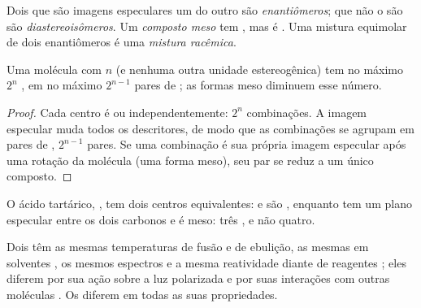 \begin{definition}\label{def:b1:stereochemistry-in-depth:enantiomers}
Dois  que são imagens especulares um do outro são
\emph{enantiômeros};  que não o são são
\emph{diastereoisômeros}. Um \emph{composto
meso} tem , mas é . Uma
mistura equimolar de dois enantiômeros é uma \emph{mistura
racêmica}.
\end{definition}

\begin{proposition}\label{prop:b1:stereochemistry-in-depth:max-stereoisomers}
Uma molécula com $n$  (e nenhuma outra unidade
estereogênica) tem no máximo $2^n$ , em no máximo
$2^{n-1}$ pares de ; as formas meso diminuem esse número.
\end{proposition}

\begin{proof}
Cada centro é  ou  independentemente: $2^n$ combinações. A
imagem especular muda todos os descritores, de modo que as combinações
se agrupam em pares de , $2^{n-1}$ pares. Se uma combinação
é sua própria imagem especular após uma rotação da molécula (uma forma
meso), seu par se reduz a um único composto.
\end{proof}

O ácido tartárico, , tem dois centros
equivalentes:  e  são , enquanto 
tem um plano especular entre os dois carbonos e é meso: três
, e não quatro.

\begin{proposition}\label{prop:b1:stereochemistry-in-depth:enantiomer-properties}
Dois  têm as mesmas temperaturas de fusão e de ebulição, as
mesmas  em solventes , os mesmos espectros e a
mesma reatividade diante de reagentes ; eles diferem por sua
ação sobre a luz polarizada e por suas interações com outras moléculas
. Os  diferem em todas as suas propriedades.
\end{proposition}

